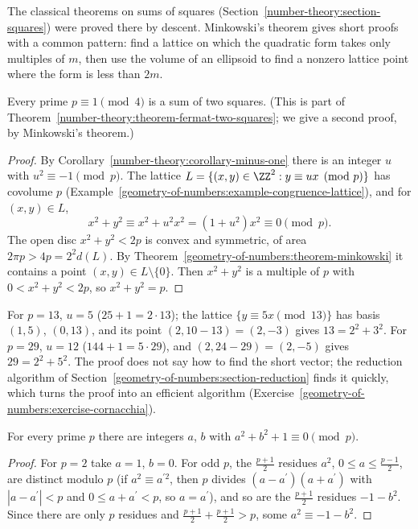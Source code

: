 The classical theorems on sums of squares (Section~\ref{number-theory:section-squares}) were proved there by descent. Minkowski's theorem gives short proofs with a common pattern: find a lattice on which
the quadratic form takes only multiples of $m$, then use the volume of an ellipsoid to find a nonzero lattice point where the form is less than $2m$.

\begin{theorem}[Fermat]\label{geometry-of-numbers:theorem-two-squares}
Every prime $p \equiv 1 \pmod 4$ is a sum of two squares. (This is part of Theorem~\ref{number-theory:theorem-fermat-two-squares}; we give a second proof, by Minkowski's theorem.)
\end{theorem}

\begin{proof}
By Corollary~\ref{number-theory:corollary-minus-one} there is an integer $u$ with $u^2 \equiv -1 \pmod p$. The lattice $L = \{(x, y) \in \ZZ^2 : y \equiv ux \pmod p\}$ has covolume $p$
(Example~\ref{geometry-of-numbers:example-congruence-lattice}), and for $(x, y) \in L$,
\[
x^2 + y^2 \equiv x^2 + u^2x^2 = (1 + u^2)x^2 \equiv 0 \pmod p.
\]
The open disc $x^2 + y^2 < 2p$ is convex and symmetric, of area $2\pi p > 4p = 2^2d(L)$. By Theorem~\ref{geometry-of-numbers:theorem-minkowski} it contains a point $(x, y) \in L \setminus \{0\}$.
Then $x^2 + y^2$ is a multiple of $p$ with $0 < x^2 + y^2 < 2p$, so $x^2 + y^2 = p$.
\end{proof}

\begin{example}\label{geometry-of-numbers:example-two-squares}
For $p = 13$, $u = 5$ ($25 + 1 = 2 \cdot 13$); the lattice $\{y \equiv 5x \pmod{13}\}$ has basis $(1, 5)$, $(0, 13)$, and its point $(2, 10 - 13) = (2, -3)$ gives $13 = 2^2 + 3^2$. For $p = 29$, $u = 12$
($144 + 1 = 5 \cdot 29$), and $(2, 24 - 29) = (2, -5)$ gives $29 = 2^2 + 5^2$. The proof does not say how to find the short vector; the reduction algorithm of
Section~\ref{geometry-of-numbers:section-reduction} finds it quickly, which turns the proof into an efficient algorithm (Exercise~\ref{geometry-of-numbers:exercise-cornacchia}).
\end{example}

\begin{lemma}\label{geometry-of-numbers:lemma-two-squares-plus-one}
For every prime $p$ there are integers $a$, $b$ with $a^2 + b^2 + 1 \equiv 0 \pmod p$.
\end{lemma}

\begin{proof}
For $p = 2$ take $a = 1$, $b = 0$. For odd $p$, the $\frac{p+1}{2}$ residues $a^2$, $0 \leq a \leq \frac{p-1}{2}$, are distinct modulo $p$ (if $a^2 \equiv a^{\prime2}$, then $p$ divides
$(a - a^{\prime})(a + a^{\prime})$ with $|a - a^{\prime}| < p$ and $0 \leq a + a^{\prime} < p$, so $a = a^{\prime}$), and so are the $\frac{p+1}{2}$ residues $-1 - b^2$. Since there are only $p$ residues and
$\frac{p+1}{2} + \frac{p+1}{2} > p$, some $a^2 \equiv -1 - b^2$.
\end{proof}

